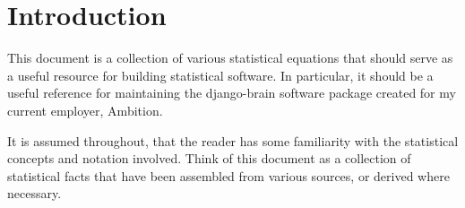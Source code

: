 \documentclass[../../main.tex]{subfiles}
\begin{document}
\chapter{Introduction}
This document is a collection of various statistical equations that should
serve as a useful resource for building statistical software.  In particular,
it should be a useful reference for maintaining the django-brain software
package created for my current employer, Ambition.

It is assumed throughout, that the reader has some familiarity with the
statistical concepts and notation involved.  Think of this document as a
collection of statistical facts that have been assembled from various sources,
or derived where necessary.
\end{document}
